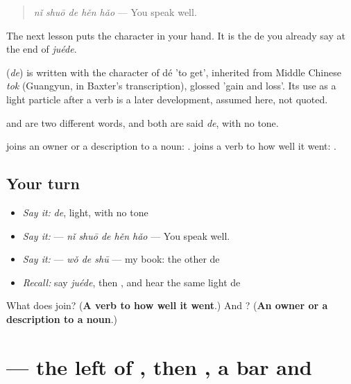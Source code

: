\begin{quote}
\textbf{} \emph{nǐ shuō de hěn hǎo} — You speak well.
\end{quote}

The next lesson puts the character in your hand. It is the de you already say at the end of \emph{juéde}.

\begin{cousinweb}
\textbf{} (\emph{de}) is written with the character of dé 'to get', inherited from Middle Chinese \emph{tok} (Guangyun, in Baxter's transcription), glossed 'gain and loss'. Its use as a light particle after a verb is a later development, assumed here, not quoted.
\end{cousinweb}

\begin{grammarlens}[title={What you've built}]
 and  are two different words, and both are said \emph{de}, with no tone.

 joins an owner or a description to a noun: .  joins a verb to how well it went: .
\end{grammarlens}

\subsection*{Your turn}
\begin{itemize}
\raggedright
  \item \emph{Say it:} \emph{de}, light, with no tone
  \item \emph{Say it:}  — \emph{nǐ shuō de hěn hǎo} — You speak well.
  \item \emph{Say it:}  — \emph{wǒ de shū} — my book: the other de
  \item \emph{Recall:} say \emph{juéde}, then , and hear the same light de
\end{itemize}

\begin{tcolorbox}[breakable,colback=teal!4,colframe=teal!35!black,title={Before you move on}]
What does  join? (\textbf{A verb to how well it went}.) And ? (\textbf{An owner or a description to a noun}.)
\end{tcolorbox}
\section[\texorpdfstring{\zh{得} (de)}{得 (de)}]{ — the left of , then , a bar and }


